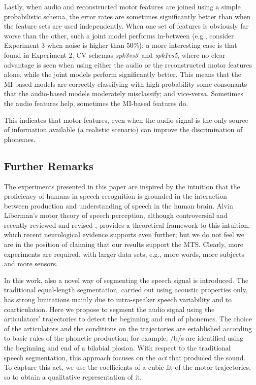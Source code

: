 \documentclass{pnastwo}
\newcommand{\spkb}{\emph{spk3vs3}}
\newcommand{\spkc}{\emph{spk1vs5}}
\begin{document}
\begin{article}
Lastly, when audio and reconstructed motor features are joined using a simple probabilistic schema, the error rates
are sometimes significantly better than when the feature sets are used independently.
When one set of features is obviously far worse than the other, such a joint model performs in-between (e.g., consider
Experiment 3 when noise is higher than $50\%$); a more interesting case is that
found in Experiment 2, CV schemas \spkb\ and \spkc, where no clear advantage is seen
when using either the audio or the reconstructed motor features alone, while
the joint models perform significantly better. This means that the MI-based models are
correctly classifying with high probability some consonants that the audio-based models
moderately misclassify; and vice-versa. Sometimes the audio features help, sometimes the
MI-based features do.

This indicates that motor features, even when the audio signal is the only source of
information available (a realistic scenario) can improve the discrimination of phonemes.

\subsection{Further Remarks}

The experiments presented in this paper are inspired by the intuition that the
proficiency of humans in speech recognition is grounded in the interaction
between production and understanding of speech in the human brain. Alvin
Liberman's motor theory of speech perception, although controversial and
recently reviewed and revised \cite{liberman1,liberman2,galant,massaro},
provides a theoretical framework to this intuition, which recent neurological
evidence \cite{dausilio} supports even further; but we do not feel we are in
the position of claiming that our results support the MTS. Clearly, more
experiments are required, with larger data sets, e.g., more words, more subjects
and more sensors.

In this work, also a novel way of segmenting the speech signal is introduced.
The traditional equal-length segmentation, carried out using acoustic properties
only, has strong limitations mainly due to intra-speaker speech variability and
to coarticulation. Here we propose to segment the audio signal using the articulators'
trajectories to detect the beginning and end of phonemes. The choice of the articulators
and the conditions on the trajectories are established according to basic rules of
the phonetic production; for example, /b/s are identified using the beginning and end of
a bilabial plosion. With respect to the traditional speech segmentation, this approach
focuses on the \emph{act} that produced the sound. To capture this act, we use the
coefficients of a cubic fit of the motor trajectories, so to obtain a qualitative
representation of it.


\end{article}
\end{document}
